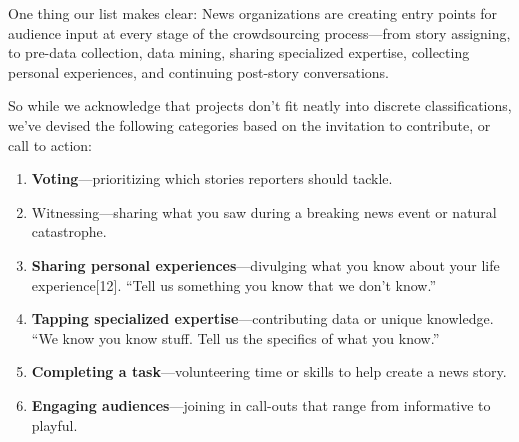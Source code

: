 \begin{itemize}
One thing our list makes clear: News organizations are creating entry points for audience input at every stage of the crowdsourcing process---from story assigning, to pre-data collection, data mining, sharing specialized expertise, collecting personal experiences, and continuing post-story conversations.

So while we acknowledge that projects don’t fit neatly into discrete classifications, we’ve devised the following categories based on the invitation to contribute, or call to action:
\begin{enumerate}
\item \textbf{Voting}---prioritizing which stories reporters should tackle. 
\item Witnessing---sharing what you saw during a breaking news event or natural catastrophe.
\item \textbf{Sharing personal experiences}---divulging what you know about your life experience[12]. ``Tell us something you know that we don’t know.''
\item \textbf{Tapping specialized expertise}---contributing data or unique knowledge. ``We know you know stuff. Tell us the specifics of what you know.''
\item \textbf{Completing a task}---volunteering time or skills to help create a news story.
\item \textbf{Engaging audiences}---joining in call-outs that range from informative to playful.
\end{enumerate}

\end{itemize}
